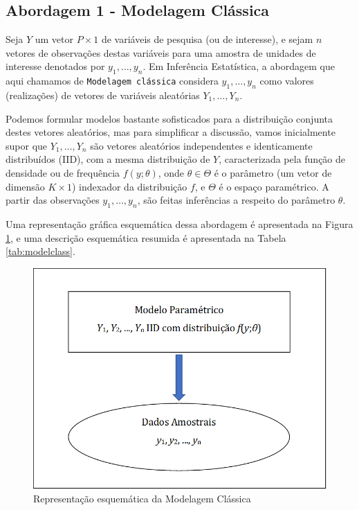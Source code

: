 \documentclass[]{book}
\theoremstyle{definition}
\theoremstyle{definition}
\theoremstyle{definition}
\theoremstyle{remark}
\begin{document}
\subsection{Abordagem 1 - Modelagem
Clássica}\label{abordagem-1---modelagem-classica}

Seja \(Y\) um vetor \(P \times 1\) de variáveis de pesquisa (ou de
interesse), e sejam \(n\) vetores de observações destas variáveis para
uma amostra de unidades de interesse denotados por \(y_1,\ldots ,y_n\).
Em Inferência Estatística, a abordagem que aqui chamamos de
\texttt{Modelagem\ clássica} considera \(y_1,\ldots ,y_n\) como valores
(realizações) de vetores de variáveis aleatórias \(Y_1,\ldots ,Y_n\).

Podemos formular modelos bastante sofisticados para a distribuição
conjunta destes vetores aleatórios, mas para simplificar a discussão,
vamos inicialmente supor que \(Y_1,\ldots ,Y_n\) são vetores aleatórios
independentes e identicamente distribuídos (IID), com a mesma
distribuição de \(Y\), caracterizada pela função de densidade ou de
frequência \(f(y;\theta)\), onde \(\theta \in \Theta\) é o parâmetro (um
vetor de dimensão \(K \times 1\)) indexador da distribuição \(f\), e
\(\Theta\) é o espaço paramétrico. A partir das observações
\(y_1,\ldots ,y_n\), são feitas inferências a respeito do parâmetro
\(\theta\).

Uma representação gráfica esquemática dessa abordagem é apresentada na
Figura \ref{fig:modclas}, e uma descrição esquemática resumida é
apresentada na Tabela \ref{tab:modelclass}.

\begin{figure}
\centering
\includegraphics{Figuras/Figura2.1.png}
\caption{\label{fig:modclas}Representação esquemática da Modelagem Clássica}
\end{figure}
\end{document}
